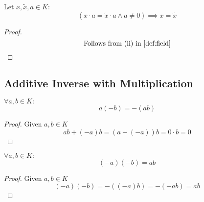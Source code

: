 \begin{proposition}[\(x \cdot a = \tilde{x} \cdot a\)]
   Let \(x, \tilde{x}, a \in K:\)
   \[(x \cdot a = \tilde{x} \cdot a \land a \neq 0) \implies x = \tilde{x}\]
\end{proposition}
\begin{proof}
   \[\text{Follows from (ii) in \cref{def:field}}\]
\end{proof}

\subsection{Additive Inverse with Multiplication}
\begin{proposition}[\(a(-b) = -(ab)\)]
   \(\forall a, b \in K:\)
   \[a(-b) = -(ab)\]
\end{proposition}
\begin{proof}
   Given \(a, b \in K\)
   \[ab + (-a)b = (a + (-a))b = 0 \cdot b = 0\]
\end{proof}

\begin{proposition}[\((-a)(-b) = ab\)]
   \(\forall a, b \in K:\)
   \[(-a)(-b) = ab\]
\end{proposition}
\begin{proof}
   Given \(a, b \in K\)
   \[(-a)(-b) = -((-a)b) = -(-ab) = ab\]
\end{proof}
